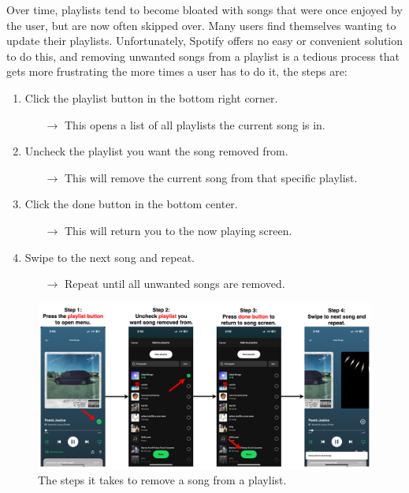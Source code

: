 \documentclass{article}
\begin{document}
Over time, playlists tend to become bloated with songs that were once enjoyed by the user, but are now often skipped over. Many users find themselves wanting to update their playlists. Unfortunately, Spotify offers no easy or convenient solution to do this, and removing unwanted songs from a playlist is a tedious process that gets more frustrating the more times a user has to do it, the steps are:
\begin{enumerate}
  \item Click the playlist button in the bottom right corner.
  \begin{itemize}
    \item[$\rightarrow$] This opens a list of all playlists the current song is in.
  \end{itemize}

  \item Uncheck the playlist you want the song removed from.
  \begin{itemize}
    \item[$\rightarrow$] This will remove the current song from that specific playlist.
  \end{itemize}

  \item Click the done button in the bottom center.
  \begin{itemize}
    \item[$\rightarrow$] This will return you to the now playing screen.
  \end{itemize}

  \item Swipe to the next song and repeat.
  \begin{itemize}
    \item[$\rightarrow$] Repeat until all unwanted songs are removed.
  \end{itemize}
\end{enumerate}

\begin{figure}[ht]
  \centering
  \includegraphics[width=\textwidth]{./spotify_diagram.png}
  \caption{The steps it takes to remove a song from a playlist.}
  \label{fig:spotify_diagram}
\end{figure}
\end{document}

